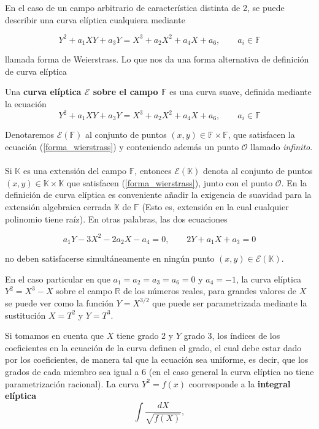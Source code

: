 \documentclass[12pt,oneside]{book}
\begin{document}
En el caso de un campo arbitrario de caracter\'istica distinta de 2, se puede describir una curva el\'iptica cualquiera mediante

$$Y^2 + a_1 XY + a_3 Y = X^3 + a_2 X^2 + a_4 X + a_6, \qquad a_i\in\mathbb{F}$$

llamada forma de Weierstrass. Lo que nos da una forma alternativa de definici\'on de curva el\'iptica

\begin{defi}
Una \textbf{curva el\'iptica $\mathcal{E}$ sobre el campo $\mathbb{F}$} es una curva suave, definida mediante la ecuaci\'on
\begin{equation}\label{forma_wierstrass}
Y^2 + a_1 XY + a_3 Y = X^3 + a_2 X^2 + a_4 X + a_6, \qquad a_i\in\mathbb{F}
\end{equation}
\end{defi}

Denotaremos $\mathcal{E}(\mathbb{F})$ al conjunto de puntos $(x,y)\in \mathbb{F}\times\mathbb{F}$, que satisfacen la ecuaci\'on (\ref{forma_wierstrass}) y conteniendo adem\'as un punto $\mathcal{O}$ llamado \textit{infinito}.
\\ \\

Si $\mathbb{K}$ es una extensi\'on del campo $\mathbb{F}$, entonces $\mathcal{E}(\mathbb{K})$ denota al conjunto de puntos $(x,y)\in \mathbb{K}\times\mathbb{K}$ que satisfacen (\ref{forma_wierstrass}), junto con el punto $\mathcal{O}$. En la definici\'on de curva el\'iptica es conveniente a\~nadir la exigencia de suavidad para la extensi\'on algebraica cerrada $\mathbb{K}$ de $\mathbb{F}$ (Esto es, extensi\'on en la cual cualquier polinomio tiene ra\'iz). En otras palabras, las dos ecuaciones

$$a_1 Y -3X^2-2a_2 X-a_4 = 0, \qquad 2 Y +a_1 X + a_3 =0$$

no deben satisfacerse simult\'aneamente en ning\'un punto $(x,y)\in\mathcal{E}(\mathbb{K})$.

En el caso particular en que $a_1=a_2=a_3=a_6=0$ y $a_4=-1$, la curva el\'iptica $Y^2 = X^3 -X$ sobre el campo $\mathbb{R}$ de los n\'umeros reales, para grandes valores de $X$ se puede ver como la funci\'on $Y=X^{3/2}$ que puede ser parametrizada mediante la sustituci\'on $X=T^2$ y $Y=T^3$.

Si tomamos en cuenta que $X$ tiene grado 2 y $Y$ grado 3, los \'indices de los coeficientes en la ecuaci\'on de la curva definen el grado, el cual debe estar dado por los coeficientes, de manera tal que la ecuaci\'on sea uniforme, es decir, que los grados de cada miembro sea igual a 6 (en el caso general la curva el\'iptica no tiene parametrizaci\'on racional). La curva $Y^2=f(x)$ coorresponde a la \textbf{integral el\'iptica} 
$$\int{\frac{dX}{\sqrt{f(X)}}},$$
\end{document}
